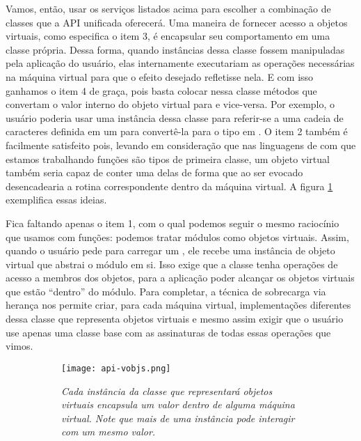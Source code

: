     Vamos, então, usar os serviços listados acima para escolher a combinação de
    classes que a API unificada oferecerá. Uma maneira de fornecer acesso a
    objetos virtuais, como especifica o item 3, é encapsular seu comportamento
    em uma classe própria. Dessa forma, quando instâncias dessa classe fossem
    manipuladas pela aplicação do usuário, elas internamente executariam as
    operações necessárias na máquina virtual para que o efeito desejado
    refletisse nela. E com isso ganhamos o item 4 de graça, pois basta colocar
    nessa classe métodos que convertam o valor interno do objeto virtual para
    \CXX{} e vice-versa. Por exemplo, o usuário poderia usar uma instância dessa
    classe para referir-se a uma cadeia de caracteres definida em um \script{}
    para convertê-la para o tipo  em \CXX{}. O item 2 também
    é facilmente satisfeito pois, levando em consideração que nas linguagens de
    \script{} com que estamos trabalhando funções são tipos de primeira
    classe\footnotemark{}, um objeto virtual também seria capaz de conter uma
    delas de forma que ao ser evocado desencadearia a rotina correspondente
    dentro da máquina virtual. A figura \ref{fig:api-vobjs} exemplifica essas
    ideias.


    Fica faltando apenas o item 1, com o qual podemos seguir o mesmo raciocínio
    que usamos com funções: podemos tratar módulos como objetos virtuais. Assim,
    quando o usuário pede para carregar um \script{}, ele recebe uma instância
    de objeto virtual que abstrai o módulo em si. Isso exige que a classe
    tenha operações de acesso a membros dos objetos, para a aplicação poder
    alcançar os objetos virtuais que estão ``dentro'' do módulo. Para completar,
    a técnica de sobrecarga via herança nos permite criar, para cada máquina
    virtual, implementações diferentes dessa classe que representa objetos
    virtuais e mesmo assim exigir que o usuário use apenas uma classe base com
    as assinaturas de todas essas operações que vimos. 

    \begin{figure}[ht]
      \centering
      \caption{}
      \begin{subfigure}{.8\textwidth}
        \begin{center}
          \texttt{[image: api-vobjs.png]}
          \vspace{1em}
        \end{center}
        \textit{
          Cada instância da classe que representará objetos virtuais encapsula
          um valor dentro de alguma máquina virtual. Note que mais de uma
          instância pode interagir com um mesmo valor.
        }
      \end{subfigure}
      \label{fig:api-vobjs}
    \end{figure}

